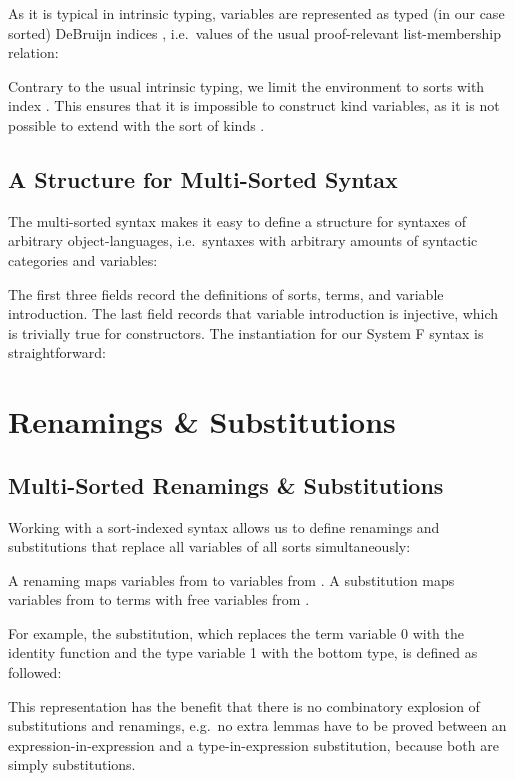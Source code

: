 \documentclass[sigplan,10pt]{acmart}
\newenvironment{LibCode*}{%
  \begin{tcolorbox}[%
    colframe=white,%
    boxrule=0.0pt,%
    top=2.5pt,%
    left=2.5pt,%
    bottom=2.5pt,%
    right=2.5pt,%
    boxsep=0pt%
  ]\vspace{-0.2\baselineskip}%
}{%
  \vspace{-1\baselineskip}%
  \end{tcolorbox}%
}
\newenvironment{ExampleCode*}{%
  \begin{tcolorbox}[%
    colframe=white,%
    colback=yellow!5,%
    boxrule=0.0pt,%
    top=2.5pt,%
    left=2.5pt,%
    bottom=2.5pt,%
    right=2.5pt,%
    boxsep=0pt%
  ]\vspace{-0.2\baselineskip}%
}{%
  \vspace{-1\baselineskip}%
  \end{tcolorbox}%
}
\newcommand*\LibCode[1]{\begin{LibCode*}{#1}\end{LibCode*}}
\newcommand*\AppCode[1]{{#1}}
\newcommand*\ExampleCode[1]{\begin{ExampleCode*}{#1}\end{ExampleCode*}}
\newcommand*\ACode[1]{\AgdaFontStyle{\textcolor{mygray}{#1}}}
\newcommand*\AField[1]{\AgdaField{#1}}
\newcommand*\ACon[1]{\AgdaInductiveConstructor{#1}}
\newcommand*\ADef[1]{\AgdaFunction{#1}}
\begin{document}
  As it is typical in intrinsic typing, variables are represented as
  typed (in our case sorted) DeBruijn indices \ACode{S \ACon{∋} s}, i.e.\
  values of the usual proof-relevant list-membership relation:
  \LibCode\KVariables

  Contrary to the usual intrinsic typing, we limit the environment
  \ACode{S} to sorts with index \ACode{\ACon{Var}}.
  This ensures that it is impossible to construct kind variables, as
  it is not possible to extend \ACode{S} with the sort of kinds
  \ACode{\ACon{𝕜}}.

  \subsection{A Structure for Multi-Sorted Syntax}
  The multi-sorted syntax makes it easy to define a structure for
  syntaxes of arbitrary object-languages, i.e.\ syntaxes with
  arbitrary amounts of syntactic categories and variables:
  \LibCode\KTerms
  The first three fields record the definitions of sorts, terms, and variable introduction.
  The last field records that variable introduction
  \ACode{\AField{`\_}} is injective, which is trivially true for
  constructors. The instantiation for our System F syntax is
  straightforward:
  \AppCode\FTerms

  \section{Renamings \& Substitutions}
  \subsection{Multi-Sorted Renamings \& Substitutions}
  Working with a sort-indexed syntax allows us to define renamings and substitutions
  that replace all variables of all sorts simultaneously:

  \ExampleCode\FExampleSubRen

  A renaming \ACode{S₁ \ADef{→ᵣ} S₂} maps variables from \ACode{S₁} to
  variables from \ACode{S₂}.
  A substitution \ACode{S₁ \ADef{→ₛ} S₂} maps variables from \ACode{S₁} to
  terms with free variables from \ACode{S₂}.

  For example, the substitution, which replaces the term variable 0 with the
  identity function and the type variable 1 with the bottom type, is defined
  as followed:
  \ExampleCode\FExampleSub

  This representation has the benefit that there is no combinatory
  explosion of substitutions and renamings, e.g.\ no extra lemmas have to be
  proved between an expression-in-expression and a type-in-expression
  substitution, because both are simply substitutions.
\end{document}
